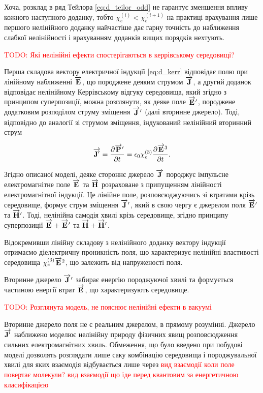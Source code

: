 Хоча, розклад в ряд Тейлора \eqref{eq:d_teilor_odd} не гарантує зменшення 
впливу кожного наступного доданку, тобто $ \chi_e^{(i)} < \chi_e^{(i+1)} $
на практиці врахування лише першого нелінійного доданку найчастіше дає
гарну точність до наближення слабкої нелінійності і врахуванням доданків
вищих порядків нехтують.

\textcolor{red}{TODO: Які нелінійні ефекти спостерігаються в 
керрівському середовищі?}

Перша складова вектору електричної індукції \eqref{eq:d_kerr} відповідає 
полю при лінійному наближенні $ \overrightarrow{\mathbf E} $, що породжене деяким 
струмом $ \overrightarrow{\mathbf J} $, а другий доданок відповідає нелінійному Керрівському 
відгуку середовища, який згідно з принципом суперпозиції, можна розглянути, 
як деяке поле $ \overrightarrow{\mathbf E}^\prime $, породжене додатковим розподілом струму 
зміщення $ \overrightarrow{\mathbf J}^\prime $ (далі вторинне джерело). Тоді, відповідно до
аналогії зі струмом зміщення, індукований нелінійний вторинний струм

\begin{equation} \label{eq:j_kerr}
\overrightarrow{\mathbf J^\prime} = \frac{\partial \overrightarrow{\mathbf P}^\prime}{\partial t} = 
\epsilon_0 \chi_e^{(3)} \frac{\partial \overrightarrow{\mathbf E}^3}{\partial t}.
\end{equation}

Згідно описаної моделі, деяке стороннє джерело $ \overrightarrow{\mathbf J} $ породжує 
імпульсне електромагнітне поле $ \overrightarrow{\mathbf E} $ та $ \overrightarrow{\mathbf H} $ розраховане
з припущенням лінійності електромагнітної індукції. Це лінійне поле, 
розповсюджуючись зі втратами крізь середовище, формує струм зміщення 
$ \overrightarrow{\mathbf J}^\prime $, який в свою чергу є джерелом поля $ \overrightarrow{\mathbf E}^\prime $ 
та $ \overrightarrow{\mathbf H}^\prime $. Тоді, нелінійна самодія хвилі крізь середовище, 
згідно принципу суперпозиції $ \overrightarrow{\mathbf E} + \overrightarrow{\mathbf E}^\prime $ та 
$ \overrightarrow{\mathbf H} + \overrightarrow{\mathbf H}^\prime $.

Відокремивши лінійну складову з нелінійного доданку вектору індукції 
отримаємо діелектричну проникність поля, що характеризує нелінійні 
властивості середовища $ \chi_e^{(3)} \overrightarrow{\mathbf E}^2 $, що залежить від 
напруженості поля.

Вторинне джерело $ \overrightarrow{\mathbf J}^\prime $ забирає енергію породжуючої хвилі та 
формується частиною енергії втрат $ \overrightarrow{\mathbf E} $, що характеризують середовище.

\textcolor{red}{TODO: Розглянута модель, не пояснює нелінійні ефекти в вакуумі}

Вторинне джерело поля не є реальним джерелом, в прямому розумінні. 
Джерело $ \overrightarrow{\mathbf J^\prime} $ наближено моделює нелінійну природу фізичних 
явищ розповсюдження сильних електромагнітних хвиль. Обмеження, що було 
введено при побудові моделі дозволять розглядати лише саку комбінацію 
середовища і породжувальної хвилі для яких взаємодія відбувається лише
через \textcolor{red}{вид взаємодії коли поле повертає молекули? 
вид взаємодії що іде перед квантовим за енергетичною класифікацією}

